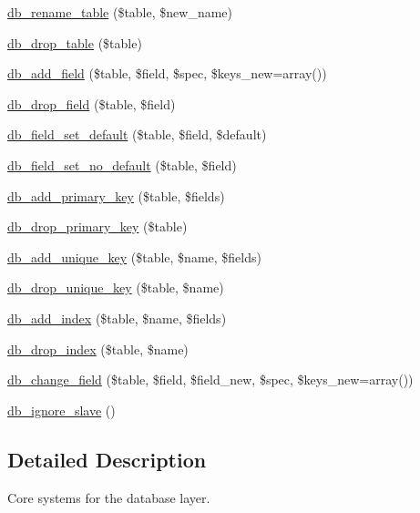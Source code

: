 \begin{DoxyCompactItemize}
\item 
\hyperlink{group__schemaapi_ga629fe4d738f4caeb9d8c8acc2cc4d05b}{db\_\-rename\_\-table} (\$table, \$new\_\-name)
\item 
\hyperlink{group__schemaapi_ga5d744ae7a6fe2c9eaa1c7bd350a071d3}{db\_\-drop\_\-table} (\$table)
\item 
\hyperlink{group__schemaapi_ga10bc9c435dd6d36c112d7ec179840cff}{db\_\-add\_\-field} (\$table, \$field, \$spec, \$keys\_\-new=array())
\item 
\hyperlink{group__schemaapi_ga0e404d9200bf56fbed738aa4f57b3ec4}{db\_\-drop\_\-field} (\$table, \$field)
\item 
\hyperlink{group__schemaapi_ga63a499297d184dba68309dcd1b7e17d4}{db\_\-field\_\-set\_\-default} (\$table, \$field, \$default)
\item 
\hyperlink{group__schemaapi_gad1714b6920155f673f4291845fdb5f62}{db\_\-field\_\-set\_\-no\_\-default} (\$table, \$field)
\item 
\hyperlink{group__schemaapi_ga666b117ebedc9b50dacf193c6ba4dcf8}{db\_\-add\_\-primary\_\-key} (\$table, \$fields)
\item 
\hyperlink{group__schemaapi_ga733a41de3d8b74798a8cf3c87ae33715}{db\_\-drop\_\-primary\_\-key} (\$table)
\item 
\hyperlink{group__schemaapi_gad6dd1c6f39d180bc21853ac6118a8f40}{db\_\-add\_\-unique\_\-key} (\$table, \$name, \$fields)
\item 
\hyperlink{group__schemaapi_gab06ca0fe63625f37a649cf3432fd8ffe}{db\_\-drop\_\-unique\_\-key} (\$table, \$name)
\item 
\hyperlink{group__schemaapi_gafb7153a65df9b5a0877a602cde86a0cc}{db\_\-add\_\-index} (\$table, \$name, \$fields)
\item 
\hyperlink{group__schemaapi_gaa59d447eb4a7b25350fb7404f9a70ec0}{db\_\-drop\_\-index} (\$table, \$name)
\item 
\hyperlink{group__schemaapi_ga9e0a4211eb8137e187d5f3f4fa716cea}{db\_\-change\_\-field} (\$table, \$field, \$field\_\-new, \$spec, \$keys\_\-new=array())
\item 
\hyperlink{database_8inc_a75131a7e4b6765eb3b31dcd82f064e9b}{db\_\-ignore\_\-slave} ()
\end{DoxyCompactItemize}


\subsection{Detailed Description}
Core systems for the database layer.


